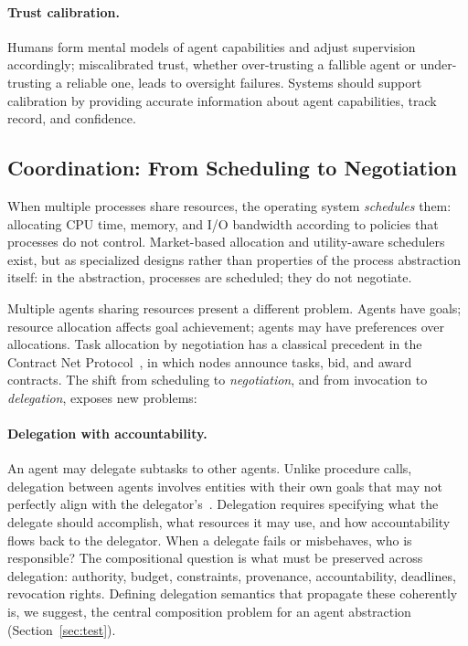 \documentclass[11pt]{article}
\begin{document}
\paragraph{Trust calibration.} Humans form mental models of agent capabilities and adjust supervision accordingly; miscalibrated trust, whether over-trusting a fallible agent or under-trusting a reliable one, leads to oversight failures. Systems should support calibration by providing accurate information about agent capabilities, track record, and confidence.

\subsection{Coordination: From Scheduling to Negotiation}
\label{sec:coordination}

When multiple processes share resources, the operating system \textit{schedules} them: allocating CPU time, memory, and I/O bandwidth according to policies that processes do not control. Market-based allocation and utility-aware schedulers exist, but as specialized designs rather than properties of the process abstraction itself: in the abstraction, processes are scheduled; they do not negotiate.

Multiple agents sharing resources present a different problem. Agents have goals; resource allocation affects goal achievement; agents may have preferences over allocations. Task allocation by negotiation has a classical precedent in the Contract Net Protocol~\cite{smith_contract_net}, in which nodes announce tasks, bid, and award contracts. The shift from scheduling to \textit{negotiation}, and from invocation to \textit{delegation}, exposes new problems:

\paragraph{Delegation with accountability.} An agent may delegate subtasks to  other agents. Unlike procedure calls, delegation between agents involves entities with their own goals that may not perfectly align with the delegator's~\cite{castelfranchi_delegation}. Delegation requires specifying what the delegate should accomplish, what resources it may use, and how accountability flows back to the delegator. When a delegate fails or misbehaves, who is responsible? The compositional question is what must be preserved across delegation: authority, budget, constraints, provenance, accountability, deadlines, revocation rights. Defining delegation semantics that propagate these coherently is, we suggest, the central composition problem for an agent abstraction (Section~\ref{sec:test}).
\end{document}
